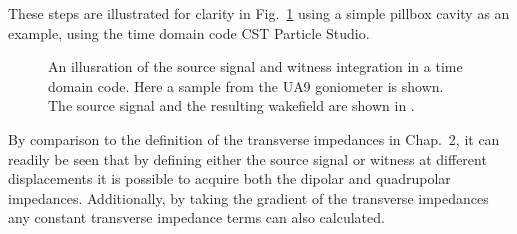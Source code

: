 These steps are illustrated for clarity in Fig.~\ref{fig:time_domain_beam} using a simple pillbox cavity as an example, using the time domain code CST Particle Studio.

\begin{figure}
\begin{center}

\end{center}
\caption{An illusration of the  source signal and witness integration in a time domain code. Here a sample from the UA9 goniometer is shown. The source signal and the resulting wakefield are shown in .}
\label{fig:time_domain_beam}
\end{figure}

By comparison to the definition of the transverse impedances in Chap.~2, it can readily be seen that by defining either the source signal or witness at different displacements it is possible to acquire both the dipolar and quadrupolar impedances. Additionally, by taking the gradient of the transverse impedances any constant transverse impedance terms can also calculated.
